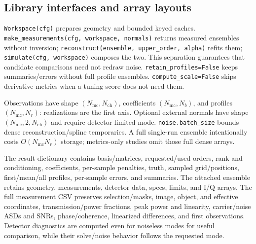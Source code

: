 \documentclass[11pt,letterpaper]{article}
\newcommand{\code}[1]{\nolinkurl{#1}}
\begin{document}
\subsection{Library interfaces and array layouts}
\code{Workspace(cfg)} prepares geometry and bounded keyed caches.
\code{make_measurements(cfg, workspace, normals)} returns measured ensembles
without inversion; \code{reconstruct(ensemble, upper_order, alpha)} refits them;
\code{simulate(cfg, workspace)} composes the two. This separation guarantees
that candidate comparisons need not redraw noise. \code{retain_profiles=False}
keeps summaries/errors without full profile ensembles. \code{compute_scale=False}
skips derivative metrics when a tuning score does not need them.

Observations have shape $(N_{\mathrm{mc}},N_{\mathrm{ch}})$, coefficients
$(N_{\mathrm{mc}},N_b)$, and profiles $(N_{\mathrm{mc}},N_r)$: realizations are
the first axis. Optional external normals have shape
$(N_{\mathrm{mc}},2,N_{\mathrm{ch}})$ and require detector-limited mode.
\code{noise.batch_size} bounds dense reconstruction/spline temporaries.
A full single-run ensemble intentionally costs $O(N_{\mathrm{mc}}N_r)$ storage;
metrics-only studies omit those full dense arrays.

The result dictionary contains basis/matrices, requested/used orders, rank and
conditioning, coefficients, per-sample penalties, truth, sampled grid/positions,
first/mean/all profiles, per-sample errors, and summaries. The attached ensemble
retains geometry, measurements, detector data, specs, limits, and I/Q arrays.
The full measurement CSV preserves selection/masks, image, object, and effective
coordinates, transmission/power fractions, peak power and linearity, carrier/noise
ASDs and SNRs, phase/coherence, linearized differences, and first observations.
Detector diagnostics are computed even for noiseless modes for useful comparison,
while their solve/noise behavior follows the requested mode.
\end{document}
